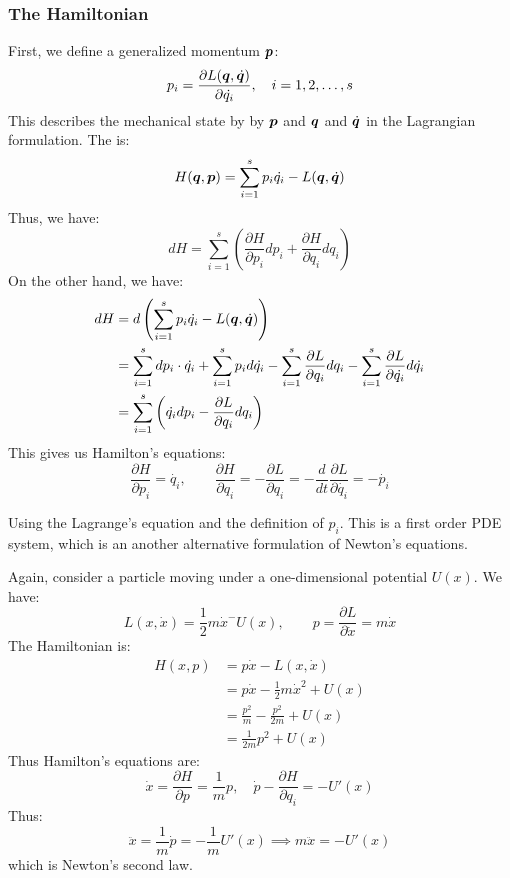 \documentclass[../main/main.tex]{subfiles}
\begin{document}
\subsubsection{The Hamiltonian}
First, we define a generalized momentum $\bm{p}$: \[
	p_i = \frac{\partial L(\bm{q},\dot{\bm{q}})}{\partial \dot{q_i}}, \quad i = 1,2 , \ldots , s
\]
This describes the mechanical state by by $\bm{p}$ and $\bm{q}$ and $\dot{\bm{q}}$ in the Lagrangian formulation. The  is: \[
	H(\bm{q},\bm{p}) = \sum\limits_{i=1}^{s}p_i \dot{q_i} - L(\bm{q},\dot{\bm{q}})
\]
Thus, we have: \[
	dH = \sum\limits_{i=1}^{s} \left( \frac{\partial H}{\partial p_i} dp_i + \frac{\partial H}{\partial q_i} dq_i \right)
\] On the other hand, we have:
\begin{align*}
	dH & = d \left( \sum\limits_{i=1}^{s}p_i \dot{q_i}-L(\bm{q},\dot{\bm{q}}) \right)                                                                                                                                                       \\
	   & = \sum\limits_{i=1}^{s}d p_i \cdot \dot{q_i} + \sum\limits_{i=1}^{s}p_i d \dot{q_i} - \sum\limits_{i=1}^{s} \frac{\partial L}{\partial q_i} dq_i - \sum\limits_{i=1}^{s} \frac{\partial L}{\partial \dot{q_i}} d \dot{q_i} \\
	   & = \sum\limits_{i=1}^{s} \left( \dot{q_i}dp_i - \frac{\partial L}{\partial q_i}d q_i \right)
\end{align*}
This gives us Hamilton's equations: \[
	\frac{\partial H}{\partial p_i} = \dot{q_i}, \quad \quad
	\frac{\partial H}{\partial q_i} = -\frac{\partial L}{\partial q_i} = -\frac{d}{dt} \frac{\partial L}{\partial \dot{q_i}} = -\dot{p_i}
\]

Using the Lagrange's equation and the definition of $p_i$. This  is a first order PDE system, which is an another alternative formulation of Newton's equations.

\begin{example}
	Again, consider a particle moving under a one-dimensional potential $U(x)$. We have: \[
		L(x, \dot{x}) = \frac{1}{2} m \dot{x}^ - U(x), \quad\quad p = \frac{\partial L}{\partial \dot{x}}=m \dot{x}
	\]
	The Hamiltonian is:
	\begin{align*}
		H(x,p) & = p \dot{x} - L(x, \dot{x})                  \\
		       & = p \dot{x} - \frac{1}{2} m \dot{x}^2 + U(x) \\
		       & = \frac{p^2}{m} - \frac{p^2}{2m} + U(x)      \\
		       & = \frac{1}{2m} p^{2} + U(x)
	\end{align*}
	Thus Hamilton's equations are: \[
		\dot{x} = \frac{\partial H}{\partial p} = \frac{1}{m} p, \quad
		\dot{p} - \frac{\partial H}{\partial q_i} = -U'(x)
	\]  Thus: \[
		\ddot{x} = \frac{1}{m} \dot{p} = -\frac{1}{m}U'(x) \implies m \ddot{x} = -U'(x)
	\] which is Newton's second law.
\end{example}
\end{document}

